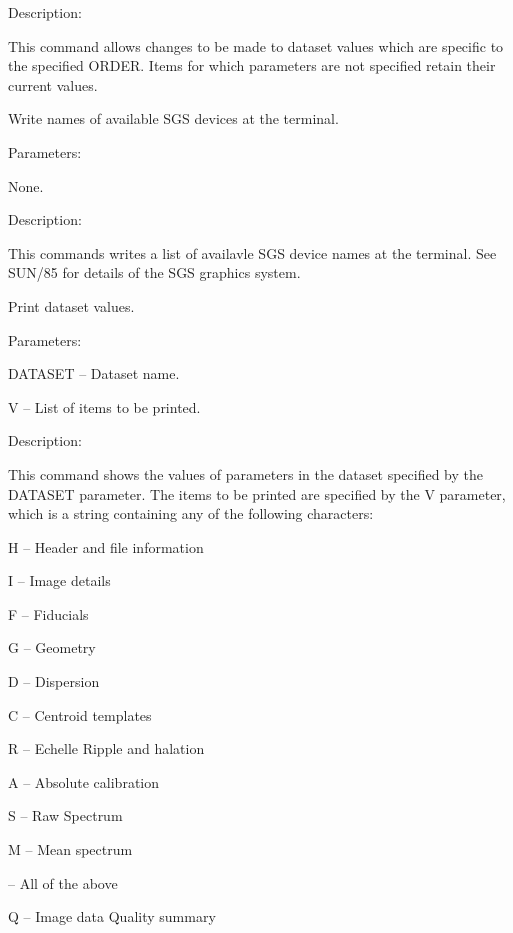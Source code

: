 \begin {description}
\begin {description}
\item Description:

This command allows changes to be made to dataset values which are
specific to the specified ORDER.
Items for which parameters are not specified retain their current
values.
\end {description}

\item [SGS]
Write names of available SGS devices at the terminal.

\begin {description}
\item Parameters:

\begin {description}
\item None.
\end {description}

\item Description:

This commands writes a list of availavle SGS device names at the terminal. See
SUN/85 for details of the SGS graphics system.
\end {description}

\item [SHOW]
Print dataset values.

\begin {description}
\item Parameters:

\begin {description}
\item DATASET -- Dataset name.
\item V -- List of items to be printed.
\end {description}

\item Description:

This command shows the values of parameters in the dataset specified
by the DATA\-SET parameter. The items to be printed are specified by the
V parameter, which is a string containing any of the following
characters:

\begin {description}
\item H -- Header and file information
\item I -- Image details
\item F -- Fiducials
\item G -- Geometry
\item D -- Dispersion
\item C -- Centroid templates
\item R -- Echelle Ripple and halation
\item A -- Absolute calibration
\item S -- Raw Spectrum
\item M -- Mean spectrum
\item * -- All of the above
\item Q -- Image data Quality summary
\end {description}


\end{description}
\end{description}
